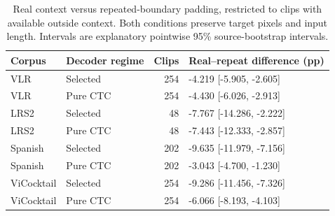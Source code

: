 \begin{table}[tb]
\centering\small
\caption{Real context versus repeated-boundary padding, restricted to clips with available outside context. Both conditions preserve target pixels and input length. Intervals are explanatory pointwise 95\% source-bootstrap intervals.}
\label{tab:intervention}
\begin{tabular}{llrl}
\toprule
Corpus & Decoder regime & Clips & Real--repeat difference (pp) \\
\midrule
VLR & Selected & 254 & -4.219 [-5.905, -2.605] \\
VLR & Pure CTC & 254 & -4.430 [-6.026, -2.913] \\
LRS2 & Selected & 48 & -7.767 [-14.286, -2.222] \\
LRS2 & Pure CTC & 48 & -7.443 [-12.333, -2.857] \\
Spanish & Selected & 202 & -9.635 [-11.979, -7.156] \\
Spanish & Pure CTC & 202 & -3.043 [-4.700, -1.230] \\
ViCocktail & Selected & 254 & -9.286 [-11.456, -7.326] \\
ViCocktail & Pure CTC & 254 & -6.066 [-8.193, -4.103] \\
\bottomrule
\end{tabular}
\end{table}

